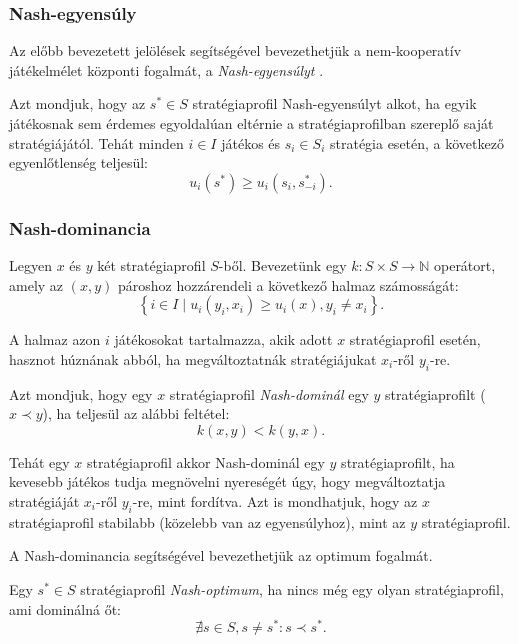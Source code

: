 \subsubsection{Nash-egyensúly}
Az előbb bevezetett jelölések segítségével bevezethetjük a nem-kooperatív játékelmélet központi fogalmát, a \emph{Nash-egyensúlyt} \cite{nash1951non}.

\begin{ert}
  Azt mondjuk, hogy az $s^* \in S$ stratégiaprofil Nash-egyensúlyt alkot,
  ha egyik játékosnak sem érdemes egyoldalúan eltérnie a stratégiaprofilban szereplő saját stratégiájától.
  Tehát minden $i \in I$ játékos és $s_i \in S_i$ stratégia esetén, a következő egyenlőtlenség teljesül:
  \[
    u_i\left(s^*\right) \ge u_i\left(s_i, s_{-i}^*\right).
  \]
\end{ert}


\subsubsection{Nash-dominancia}\label{subsubsec:NASH_DOMINANCIA}
Legyen $x$ és $y$ két stratégiaprofil $S$-ből.
Bevezetünk egy $k \colon S \times S \to \mathbb{N}$ operátort, amely az $\left( x, y \right)$ pároshoz hozzárendeli a következő halmaz számosságát:
\[
  \left\{ i \in I \mid u_i(y_i, x_i) \ge u_i(x), y_i \neq x_i \right\}.
\]

A halmaz azon $i$ játékosokat tartalmazza, akik adott $x$ stratégiaprofil esetén, hasznot húznának abból, ha megváltoztatnák stratégiájukat $x_i$-ről $y_i$-re.

\begin{ert}
  Azt mondjuk, hogy egy $x$ stratégiaprofil \emph{Nash-dominál} egy $y$ stratégiaprofilt ($x \prec y$), ha teljesül az alábbi feltétel:
  \[
    k(x,y) < k(y, x).
  \]
\end{ert}

Tehát egy $x$ stratégiaprofil akkor Nash-dominál egy $y$ stratégiaprofilt, ha kevesebb játékos tudja megnövelni nyereségét úgy, hogy megváltoztatja stratégiáját $x_i$-ről $y_i$-re, mint fordítva.
Azt is mondhatjuk, hogy az $x$ stratégiaprofil stabilabb (közelebb van az egyensúlyhoz), mint az $y$ stratégiaprofil.


A Nash-dominancia segítségével bevezethetjük az optimum fogalmát.

\begin{ert}
  Egy $s^* \in S$ stratégiaprofil \emph{Nash-optimum}, ha nincs még egy olyan stratégiaprofil, ami dominálná őt:
  \[
    \nexists s \in S, s \neq s^* \colon s \prec s^*.
  \]
\end{ert}


